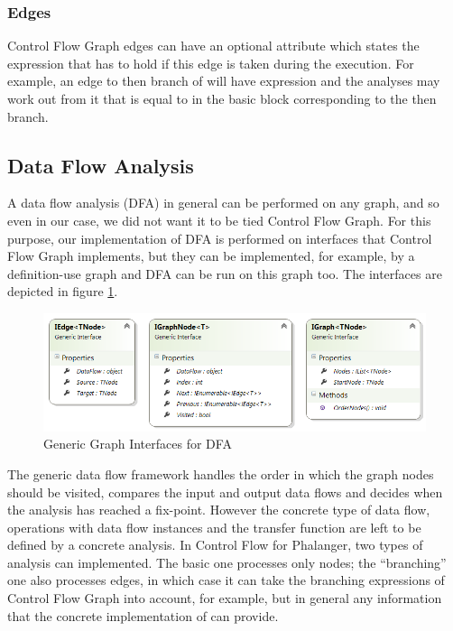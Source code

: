         \subsubsection*{Edges}
        Control Flow Graph edges can have an optional attribute which 
        states the expression that has to hold if this edge is taken 
        during the execution. For example, an edge to then branch of 
         will have expression  and the 
        analyses may work out from it that  is equal to 
         in the basic block corresponding to the then branch.
        
    \subsection{Data Flow Analysis}
        A data flow analysis (DFA) in general can be performed on any graph, 
        and so even in our case, we did not want it to be tied 
        Control Flow Graph. For this purpose, our implementation of DFA is 
        performed on interfaces that Control Flow Graph implements, 
        but they can be implemented, for example, by a definition-use 
        graph \cite{aho1985compilers} and DFA can be run on this graph too.
        The interfaces are depicted in figure \ref{graphifaces}.
        
\begin{figure}[h]  
  \centering
    \includegraphics*[width=\textwidth,height=\textheight,keepaspectratio]{img/graph-ifaces.png}  
    \caption{Generic Graph Interfaces for DFA\label{graphifaces}}
\end{figure}    

        The generic data flow framework handles the order in which the 
        graph nodes should be visited, compares the input and output 
        data flows and decides when the analysis has reached a fix-point. 
        However the concrete type of data flow, operations with data 
        flow instances and the transfer function are left to be defined 
        by a concrete analysis. In Control Flow for 
        Phalanger, two types of analysis can implemented. The basic one 
        processes only nodes; the ``branching'' one also processes edges, 
        in which case it can take the branching expressions of Control 
        Flow Graph into account, for example, but in general any information 
        that the concrete implementation of  can provide.
        
